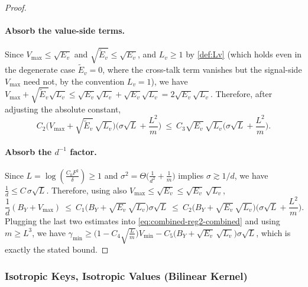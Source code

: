 \begin{proof}
\paragraph{Absorb the value-side terms.}
Since \(V_{\max}\le \sqrt{E_v}\) and \(\sqrt{\widetilde{E}_v}\le \sqrt{E_v}\), and \(L_{v}\ge1\) by \cref{def:Lv} (which holds even in the degenerate case \(\widetilde{E}_{v}=0\), where the cross-talk term vanishes but the signal-side \(V_{\max}\) need not, by the convention \(L_v=1\)), we have \(V_{\max}+\sqrt{\widetilde{E}_v}\sqrt{L_v}\le \sqrt{E_v}\sqrt{L_v}+\sqrt{E_v}\sqrt{L_v}= 2\sqrt{E_v}\sqrt{L_v}\). Therefore, after adjusting the absolute constant,
\[
C_{2}\Big(V_{\max}+\sqrt{\widetilde{E}_v}\,\sqrt{L_v}\Big)\Big(\sigma\sqrt{L}+\frac{L^2}{m}\Big)
\ \le\
C_{3}\sqrt{E_v}\,\sqrt{L_v}\Big(\sigma\sqrt{L}+\frac{L^2}{m}\Big).
\]


\paragraph{Absorb the \(d^{-1}\) factor.}
Since \(L=\log(\tfrac{C_{0} F^2}{\delta})\ge 1\) and
\(
\sigma^2=\Theta\!\big(\tfrac{1}{d^2}+\tfrac{1}{m}\big)
\)
implies \(\sigma\gtrsim 1/d\), we have \(\frac{1}{d}\le C\,\sigma\sqrt{L}\).
Therefore, using also \(V_{\max}\le \sqrt{E_v}\le \sqrt{E_v}\,\sqrt{L_v}\),
\[
\frac{1}{d}(B_{Y}+V_{\max})
\ \le\
C_{1}\Big(B_{Y}+\sqrt{E_v}\,\sqrt{L_v}\Big)\sigma\sqrt{L}
\ \le\
C_{2}\Big(B_{Y}+\sqrt{E_v}\,\sqrt{L_v}\Big)\Big(\sigma\sqrt{L}+\frac{L^2}{m}\Big).
\]
Plugging the last two estimates into \eqref{eq:combined-reg2-combined} and using $m \geq L^3$, we have
\(\gamma_{\min} \ge \Big(1-C_{4}\sqrt{\tfrac{L}{m}}\Big)V_{\min} - C_{5}\Big(B_{Y}+\sqrt{E_v}\,\sqrt{L_v}\Big)\sigma\sqrt{L}\),
which is exactly the stated bound.
\end{proof}


\subsubsection{Isotropic Keys, Isotropic Values (Bilinear Kernel)}
\label{app:combined-regime3}
\label{app:theory:margin_bounds:rkrv}
\label{app:theory:proof:exactK2}
\phantomsection\label{app:theory:proof:bilinear-scaling}
\phantomsection\label{app:theory:proof:bilinear-fact-capacity}

